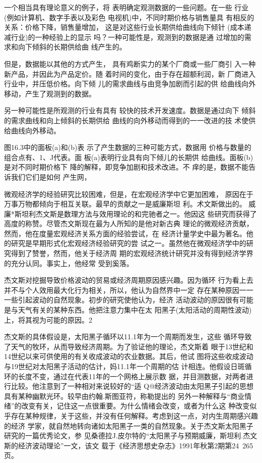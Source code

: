 一个相当具有理论意义的例子，将
表明确定观测数据的一些问题。在一些
行业(例如计算机、数字手表以及彩色
电视机)中，不同时期价格与销售量具
有相反的关系：价格下降，销售量增加，
这是对这些行业长期供给曲线向下倾针
(成本递减行业)的一种经验上的显示
吗？一种可能性是，观测到的数据是通
过增加的需求和向下倾斜的长期供给曲
线产生的。

但是，数据能以其他的方式产生，
具有鸡断实力的某个厂商或一些厂商引
入一种新产品，并因此为产品定价。随
着时间的变化，由于存在超额利润，新
厂商进入行业中，并压低价格。向下倾
儿的需求曲线与由竞争加剧而引起的供
给曲线向外移动，产生了观测到的数据。

另一种可能性是所观测的行业有具有
较快的技术开发速度。数据是通过向下
倾斜的需求曲线和向上倾斜的长期供给
曲线的向外移动而得到的一一改进的技
术使供给曲线向外移动。

图16.3中的面板(a)和(b)表
示了产生数据的三种可能方式，数据用
价格与数量的组合点有、1、J代表。面
板(a)表明行业具有向下倾儿的长期供
给曲线。面板(b)是对不同时期价格下
降的解释，即竞争加剧和技术改进。不
痒的是，数据不能告诉我们它们是如何
产生网，



微观经济学的经验研究比较困难，但是，在宏观经济学中它更加困难，
原因在于万事万物都倾向于相互关联。最早的贡献之一是威廉斯坦
利。术文斯做出的。
威廉*斯坦利杰文斯是数理方法与效用理论的和完驰者之一。他因这
些研究而获得了高度的称赞。尽管杰文斯现在最为人所知的是他对新古典
理论的微观经济贡献，然而，他在度量宏观经济关系方面的经验尝试，在
经济计量学史中最为著名。他的研究是早期形式化宏观经济经验研究的尝
试之一。虽然他在微观经济学中的研究得到了赞誉，然而，他关于经济周
期的宏观经济统计研究并没有得到经济学界的充分认同。事实上，他经常
受到奚落。

杰文斯对挖掘导致价格波动的贸易或经济周期原因感兴趣。因为循环
行为看上去并不与个人效用最大化行为相关，所以，他认为自然界中一定
存在某种原因一一一些引起波动的自然现象。初步的研究使他认为，经济
活动波动的原因很有可能是与天气有关的某种东西。他把注意力集中在太
阳黑子(太阳活动的周期性波动)上，将其视为可能的原因。2

杰文斯的具体假设是，太阳黑子循环以11.1年为一个周期而发生，这些
循环导致了天气的牧环，从而导致经济周期。为了验证他的理论，杰文斯着
眼于13世纪和14世纪以来可供使用的有关收成波动的农业数据。其后，他试
图将这些收成波动与19世纪对太阳黑子活动的估计，妈11.1年一个周期的估
计相连。他假设日斑循环的长度不变，通过在代表11年的一个网格上展示数
据，并目测数据，对两者进行比较。他注意到了一种相对来说较好的“适
Q@经济波动由太阳黑子引起的思想具有某种幽默光环。较早由约翰.斯图亚符，称勒提出的
另外一种解释与“商业情绪”的改变有关，记住这一点很重要。为什么情绪会改变，或者为什么这
种改变似乎存在某种规律，关于这些，并没有任何解释。考虑到这一点，对内生周期感兴趣的经济
学家，就自然地转向诸如太阳黑子一类的自然现象。关于杰文斯太阳黑子研究的一篇优秀论文，参
见桑德拉J.皮尔特的“太阳黑子与预期威廉，斯坦利.杰文斯的经济波动理论”一文，该文
载于《经济思想史杂志》1991年秋第2期第24~265页。


